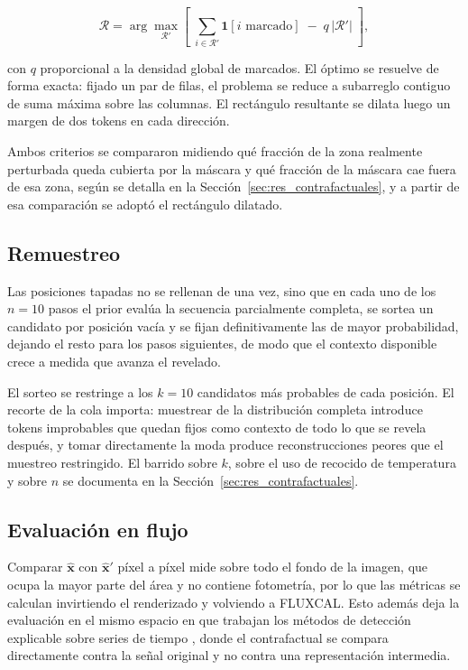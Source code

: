 \begin{equation}
\mathcal{R} = \arg\max_{\mathcal{R}'}
\left[\;\sum_{i \in \mathcal{R}'} \mathbf{1}[i \text{ marcado}] \;-\; q\,\left|\mathcal{R}'\right| \;\right],
\end{equation}

con $q$ proporcional a la densidad global de marcados. El óptimo se resuelve de forma exacta: fijado un par de filas, el problema se reduce a subarreglo contiguo de suma máxima sobre las columnas. El rectángulo resultante se dilata luego un margen de dos tokens en cada dirección.

Ambos criterios se compararon midiendo qué fracción de la zona realmente perturbada queda cubierta por la máscara y qué fracción de la máscara cae fuera de esa zona, según se detalla en la Sección~\ref{sec:res_contrafactuales}, y a partir de esa comparación se adoptó el rectángulo dilatado.

\subsection{Remuestreo}

Las posiciones tapadas no se rellenan de una vez, sino que en cada uno de los $n = 10$ pasos el prior evalúa la secuencia parcialmente completa, se sortea un candidato por posición vacía y se fijan definitivamente las de mayor probabilidad, dejando el resto para los pasos siguientes, de modo que el contexto disponible crece a medida que avanza el revelado.

El sorteo se restringe a los $k = 10$ candidatos más probables de cada posición. El recorte de la cola importa: muestrear de la distribución completa introduce tokens improbables que quedan fijos como contexto de todo lo que se revela después, y tomar directamente la moda produce reconstrucciones peores que el muestreo restringido. El barrido sobre $k$, sobre el uso de recocido de temperatura y sobre $n$ se documenta en la Sección~\ref{sec:res_contrafactuales}.

\subsection{Evaluación en flujo}
\label{sec:cf_evaluacion}

Comparar $\hat{\mathbf{x}}$ con $\hat{\mathbf{x}}'$ píxel a píxel mide sobre todo el fondo de la imagen, que ocupa la mayor parte del área y no contiene fotometría, por lo que las métricas se calculan invirtiendo el renderizado y volviendo a FLUXCAL. Esto además deja la evaluación en el mismo espacio en que trabajan los métodos de detección explicable sobre series de tiempo \cite{lee2023timevqvae_ad}, donde el contrafactual se compara directamente contra la señal original y no contra una representación intermedia.

